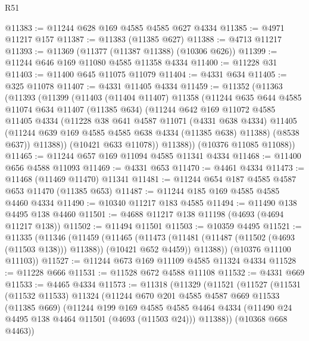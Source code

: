 \begin{lexlean}{R51}
\begin{coremodule}
@11383 := @11244 @628 @169 @4585 @4585 @627 @4334
@11385 := @4971 @11217 @157
@11387 := @11383 (@11385 @627)
@11388 := @4713 @11217
@11393 := @11369 (@11377 (@11387 @11388) (@10306 @626))
@11399 := @11244 @646 @169 @11080 @4585 @11358 @4334
@11400 := @11228 @31
@11403 := @11400 @645 @11075 @11079
@11404 := @4331 @634
@11405 := @325 @11078
@11407 := @4331 @11405 @4334
@11459 := @11352
    (@11363
      (@11393
        (@11399
          (@11403
            (@11404 @11407)
            @11358
            (@11244
              @635
              @644
              @4585
              @11074
              @634
              @11407
              (@11385 @634)
              (@11244
                @642
                @169
                @11072
                @4585
                @11405
                @4334
                (@11228
                  @38
                  @641
                  @4587
                  @11071
                  (@4331 @638 @4334)
                  @11405
                  (@11244 @639 @169 @4585 @4585 @638 @4334 (@11385 @638) @11388)
                  (@8538 @637))
                @11388))
            (@10421 @633 @11078))
          @11388))
      (@10376 @11085 @11088))
@11465 := @11244 @657 @169 @11094 @4585 @11341 @4334
@11468 := @11400 @656 @4588 @11093
@11469 := @4331 @653
@11470 := @4461 @4334
@11473 := @11468 (@11469 @11470) @11341
@11481 := @11244 @654 @187 @4585 @4587 @653 @11470 (@11385 @653)
@11487 := @11244 @185 @169 @4585 @4585 @4460 @4334
@11490 := @10340 @11217 @183 @4585
@11494 := @11490 @138 @4495 @138 @4460
@11501 := @4688 @11217 @138 @11198 (@4693 (@4694 @11217 @138))
@11502 := @11494 @11501
@11503 := @10359 @4495
@11521 := @11335
    (@11346
      (@11459
        (@11465
          (@11473 (@11481 (@11487 (@11502 (@4693 (@11503 @138))) @11388)) (@10421 @652 @4459))
          @11388))
      (@10376 @11100 @11103))
@11527 := @11244 @673 @169 @11109 @4585 @11324 @4334
@11528 := @11228 @666
@11531 := @11528 @672 @4588 @11108
@11532 := @4331 @669
@11533 := @4465 @4334
@11573 := @11318
    (@11329
      (@11521
        (@11527
          (@11531
            (@11532 @11533)
            @11324
            (@11244
              @670
              @201
              @4585
              @4587
              @669
              @11533
              (@11385 @669)
              (@11244
                @199
                @169
                @4585
                @4585
                @4464
                @4334
                (@11490 @24 @4495 @138 @4464 @11501 (@4693 (@11503 @24)))
                @11388))
            (@10368 @668 @4463))

\end{coremodule}
\end{lexlean}
